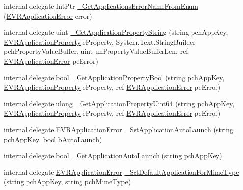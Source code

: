 \begin{DoxyCompactItemize}
internal delegate Int\+Ptr \mbox{\hyperlink{struct_valve_1_1_v_r_1_1_i_v_r_applications_aa203c7e060702643487820541bdca380}{\+\_\+\+Get\+Applications\+Error\+Name\+From\+Enum}} (\mbox{\hyperlink{namespace_valve_1_1_v_r_a3488adab8a219b579fcee50f4e63a8b6}{E\+V\+R\+Application\+Error}} error)
\item 
internal delegate uint \mbox{\hyperlink{struct_valve_1_1_v_r_1_1_i_v_r_applications_a29be5eea80ac523877cbc8596f8b6f34}{\+\_\+\+Get\+Application\+Property\+String}} (string pch\+App\+Key, \mbox{\hyperlink{namespace_valve_1_1_v_r_a60802f09ad1b4764cd5bc78369d50bf3}{E\+V\+R\+Application\+Property}} e\+Property, System.\+Text.\+String\+Builder pch\+Property\+Value\+Buffer, uint un\+Property\+Value\+Buffer\+Len, ref \mbox{\hyperlink{namespace_valve_1_1_v_r_a3488adab8a219b579fcee50f4e63a8b6}{E\+V\+R\+Application\+Error}} pe\+Error)
\item 
internal delegate bool \mbox{\hyperlink{struct_valve_1_1_v_r_1_1_i_v_r_applications_ae970669423f2d1c534e4268eb4421841}{\+\_\+\+Get\+Application\+Property\+Bool}} (string pch\+App\+Key, \mbox{\hyperlink{namespace_valve_1_1_v_r_a60802f09ad1b4764cd5bc78369d50bf3}{E\+V\+R\+Application\+Property}} e\+Property, ref \mbox{\hyperlink{namespace_valve_1_1_v_r_a3488adab8a219b579fcee50f4e63a8b6}{E\+V\+R\+Application\+Error}} pe\+Error)
\item 
internal delegate ulong \mbox{\hyperlink{struct_valve_1_1_v_r_1_1_i_v_r_applications_ac05c82e30b4622cc0e53e7ab75688677}{\+\_\+\+Get\+Application\+Property\+Uint64}} (string pch\+App\+Key, \mbox{\hyperlink{namespace_valve_1_1_v_r_a60802f09ad1b4764cd5bc78369d50bf3}{E\+V\+R\+Application\+Property}} e\+Property, ref \mbox{\hyperlink{namespace_valve_1_1_v_r_a3488adab8a219b579fcee50f4e63a8b6}{E\+V\+R\+Application\+Error}} pe\+Error)
\item 
internal delegate \mbox{\hyperlink{namespace_valve_1_1_v_r_a3488adab8a219b579fcee50f4e63a8b6}{E\+V\+R\+Application\+Error}} \mbox{\hyperlink{struct_valve_1_1_v_r_1_1_i_v_r_applications_acc22946329e6d33fc826a928d1087dfc}{\+\_\+\+Set\+Application\+Auto\+Launch}} (string pch\+App\+Key, bool b\+Auto\+Launch)
\item 
internal delegate bool \mbox{\hyperlink{struct_valve_1_1_v_r_1_1_i_v_r_applications_ae7b3dd42def4887d70c2856b79679c8a}{\+\_\+\+Get\+Application\+Auto\+Launch}} (string pch\+App\+Key)
\item 
internal delegate \mbox{\hyperlink{namespace_valve_1_1_v_r_a3488adab8a219b579fcee50f4e63a8b6}{E\+V\+R\+Application\+Error}} \mbox{\hyperlink{struct_valve_1_1_v_r_1_1_i_v_r_applications_aa326d8a6ab208fa726df73e9b0fd9351}{\+\_\+\+Set\+Default\+Application\+For\+Mime\+Type}} (string pch\+App\+Key, string pch\+Mime\+Type)

\end{DoxyCompactItemize}
